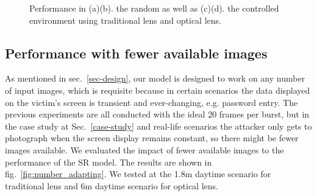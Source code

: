 \begin{figure}[!t]
    \centering
    \hfill
    \caption{Performance in (a)(b). the random as well as (c)(d). the controlled environment using traditional lens and optical lens.}
    \label{fig:control_random}
\end{figure}


\subsection{Performance with fewer available images}
As mentioned in sec.~\ref{sec-design}, our model is designed to work on any number of input images, which is requisite because in certain scenarios the data displayed on the victim's screen is transient and ever-changing, e.g. password entry. The previous experiments are all conducted with the ideal 20 frames per burst, but in the case study at Sec.~\ref{case-study} and real-life scenarios the attacker only gets to photograph when the screen display remains constant, so there might be fewer images available. We evaluated the impact of fewer available images to the performance of the SR model. The results are shown in fig.~\ref{fig:number_adapting}. We tested at the 1.8m daytime scenario for traditional lens and 6m daytime scenario for optical lens.

